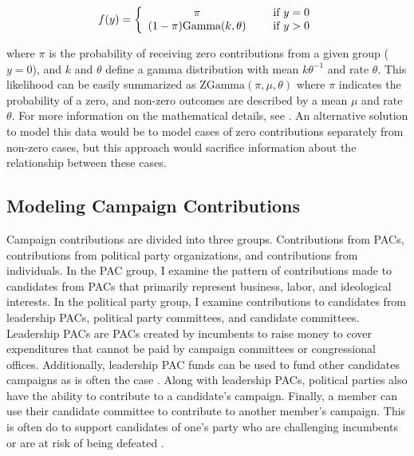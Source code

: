 \documentclass[12pt]{article}
\begin{document}
  \begin{align}
f(y) = \left\{ \begin{array}{cc} 
                \pi & \hspace{5mm} \text{if $y = 0$} \\
                (1 - \pi) \text{Gamma}(k, \theta) & \hspace{5mm}  \text{if $y > 0$} \\
                \end{array} \right.
\end{align}

\noindent where $\pi$ is the probability of receiving zero contributions from a given group ($y = 0$), and $k$ and $\theta$ define a gamma distribution with mean $k\theta^{-1}$ and rate $\theta$. This likelihood can be easily summarized as $\text{ZGamma}(\pi, \mu, \theta)$ where $\pi$ indicates the probability of a zero, and non-zero outcomes are described by a mean $\mu$ and rate $\theta$. For more information on the mathematical details, see \citet{mccullagn_generalized_1989}. An alternative solution to model this data would be to model cases of zero contributions separately from non-zero cases, but this approach would sacrifice information about the relationship between these cases. 

\subsection{Modeling Campaign Contributions}

Campaign contributions are divided into three groups. Contributions from PACs, contributions from political party organizations, and contributions from individuals. In the PAC group, I examine the pattern of contributions made to candidates from PACs that primarily represent business, labor, and ideological interests. In the political party group, I examine contributions to candidates from leadership PACs, political party committees, and candidate committees. Leadership PACs are PACs created by incumbents to raise money to cover expenditures that cannot be paid by campaign committees or congressional offices. Additionally, leadership PAC funds can be used to fund other candidates campaigns as is often the case \citep{lazer_leadership_2015}. Along with leadership PACs, political parties also have the ability to contribute to a candidate's campaign. Finally, a member can use their candidate committee to contribute to another member's campaign. This is often do to support candidates of one's party who are challenging incumbents or are at risk of being defeated \citep{lazer_candidate_2015}. 
\end{document}
